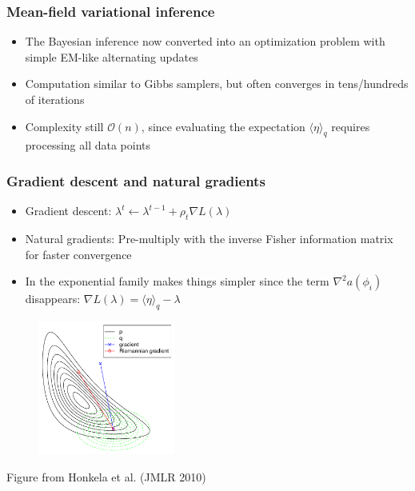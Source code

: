 \documentclass{beamer}
\newcommand{\vparameters}{\phi}
\begin{document}
\begin{frame}
  \frametitle{Mean-field variational inference}

  \begin{itemize}
    \item The Bayesian inference now converted into an optimization
      problem with simple EM-like alternating updates
    \item Computation similar to Gibbs samplers, but often converges
      in tens/hundreds of iterations
    \item Complexity still $\mathcal{O}(n)$, since evaluating the
      expectation $\langle \eta \rangle_q$ requires processing all data points
  \end{itemize}
\end{frame}

\begin{frame}
  \frametitle{Gradient descent and natural gradients}

  \begin{itemize}
    \item Gradient descent: $\lambda^t \leftarrow \lambda^{t-1}
      + \rho_t \nabla L(\lambda)$
    \item Natural gradients: Pre-multiply with the inverse Fisher
      information matrix for faster convergence
    \item In the exponential family makes things simpler since
      the term $\nabla^2 a(\vparameters_i)$ disappears:
      $\nabla L(\lambda) = \langle \eta \rangle_q - \lambda$
  \end{itemize}
  \begin{figure}
  \begin{center}
  \includegraphics[width=0.4\textwidth]{VBnatgrad.pdf}
  \end{center}
  \end{figure}
  \vfill \hfill {\tiny Figure from Honkela et al. (JMLR 2010)}
\end{frame}
\end{document}
